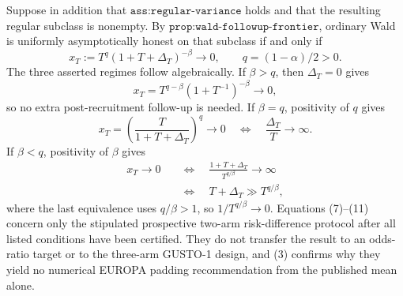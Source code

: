 Suppose in addition that \(\texttt{ass:regular-variance}\) holds and that the resulting regular subclass is nonempty.  By \(\texttt{prop:wald-followup-frontier}\), ordinary Wald is uniformly asymptotically honest on that subclass if and only if
\[
 x_T:=T^q(1+T+\Delta_T)^{-\beta}\longrightarrow0,
 \qquad q=(1-\alpha)/2>0.
\tag{8}
\]
The three asserted regimes follow algebraically.  If \(\beta>q\), then \(\Delta_T=0\) gives
\[
 x_T=T^{q-\beta}(1+T^{-1})^{-\beta}\longrightarrow0,
\tag{9}
\]
so no extra post-recruitment follow-up is needed.  If \(\beta=q\), positivity of \(q\) gives
\[
 x_T=\left(\frac{T}{1+T+\Delta_T}\right)^q\longrightarrow0
 \quad\Longleftrightarrow\quad
 \frac{\Delta_T}{T}\longrightarrow\infty.
\tag{10}
\]
If \(\beta<q\), positivity of \(\beta\) gives
\[
 \begin{aligned}
 x_T\longrightarrow0
 &\quad\Longleftrightarrow\quad
 \frac{1+T+\Delta_T}{T^{q/\beta}}\longrightarrow\infty\\
 &\quad\Longleftrightarrow\quad
 T+\Delta_T\gg T^{q/\beta},
 \end{aligned}
\tag{11}
\]
where the last equivalence uses \(q/\beta>1\), so \(1/T^{q/\beta}\to0\).  Equations (7)--(11) concern only the stipulated prospective two-arm risk-difference protocol after all listed conditions have been certified.  They do not transfer the result to an odds-ratio target or to the three-arm GUSTO-1 design, and (3) confirms why they yield no numerical EUROPA padding recommendation from the published mean alone.
